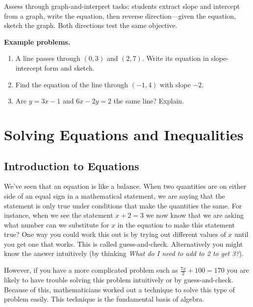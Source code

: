Assess through graph-and-interpret tasks: students extract slope and
intercept from a graph, write the equation, then reverse direction---given
the equation, sketch the graph. Both directions test the same objective.

\textbf{Example problems.}
\begin{enumerate}
    \item A line passes through $(0,3)$ and $(2,7)$. Write its equation in
          slope-intercept form and sketch.
    \item Find the equation of the line through $(-1,4)$ with slope $-2$.
    \item Are $y = 3x - 1$ and $6x - 2y = 2$ the same line? Explain.
\end{enumerate}



\section{Solving Equations and Inequalities}
\label{sec:solv-28b2}



\subsection{Introduction to Equations}
\label{sss:intr-c64b}




We've seen that an equation is like a balance. When two quantities are on either side of
an equal sign in a mathematical statement, we are saying that the statement is only true
under conditions that make the quantities the same. For instance, when we see the
statement $x+2=3$ we now know that we are asking what number can we substitute for $x$ in
the equation to make this statement true? One way you could work this out is by trying out
different values of $x$ until you get one that works. This is called guess-and-check.
Alternatively you might know the answer intuitively (by thinking \textit{What do I need to
add to 2 to get 3?}).



However, if you have a more complicated problem such as $\frac{7x}{2} + 100 = 170$ you are
likely to have trouble solving this problem intuitively or by guess-and-check. Because of
this, mathematicians worked out a technique to solve this type of problem easily. This
technique is the fundamental basis of algebra.



